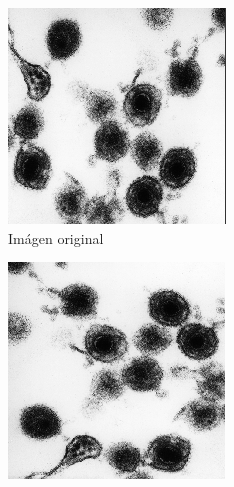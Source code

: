 \documentclass{uc3mpracticas}
\begin{document}
  \begin{figure}[!h]
    \centering
    \begin{subfigure}[b]{0.23\textwidth}
      \includegraphics[width=\textwidth, frame]{Images/og.png}
      \caption{Imágen original}
    \end{subfigure}
    \hfill
    \begin{subfigure}[b]{0.23\textwidth}
      \includegraphics[width=\textwidth, frame]{Images/rot901.png}

\end{subfigure}
\end{figure}
\end{document}
